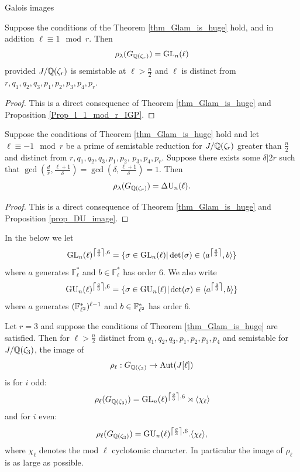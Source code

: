 \documentclass[11pt,a4paper]{article}
\newcommand{\Fl}{\mathbb{F}_\ell}
\newcommand{\Qr}{{\QQ(\zeta_r)}}
\newcommand{\Gcyclo}[1]{G_{\QQ(\zeta_{#1})}}
\newcommand{\GQr}{G_{\QQ(\zeta_{r})}}
\begin{document}
\begin{section}{Galois images}
\begin{theorem}
\label{thm_l_equiv_1_mod_r_image_of_mod_lambda}
Suppose the conditions of the Theorem \ref{thm_Glam_is_huge} hold, and in addition $\ell \equiv 1 \mod{r}$. Then \[\rho_\lambda(\GQr) = \GL_n(\ell)\]
provided $J/\Qr$ is semistable at $\ell>\frac{n}{2}$  and $\ell$ is distinct from $r,q_1,q_2,q_3,p_1,p_2,p_3,p_4,p_r$.
\end{theorem}

\begin{proof}
This is a direct consequence of Theorem \ref{thm_Glam_is_huge} and Proposition \ref{Prop_l_1_mod_r_IGP}.
\end{proof}

\begin{theorem}
\label{thm_DU_image_r=-1}
Suppose the conditions of Theorem \ref{thm_Glam_is_huge} hold and let $\ell \equiv -1 \mod{r}$ be a prime of semistable reduction for $J/\Qr$ greater than $\frac{n}{2}$ and distinct from $ r,q_1,q_2,q_3,p_1,p_2$, $p_3,p_4,p_r$.
Suppose there exists some $\delta|2r$ such that $\gcd(\frac{d}{r},\frac{\ell+1}{\delta})= \gcd(\delta, \frac{\ell+1}{\delta})=1$.
Then \[\rho_\lambda(\GQr) = \DU_n(\ell).\]
\end{theorem}

\begin{proof}
This is a direct consequence of Theorem \ref{thm_Glam_is_huge} and Proposition \ref{prop_DU_image}.
\end{proof}

In the below we let \[\GL_n(\ell)^{\left\lceil \frac{g}{3} \right\rceil, 6} = \{\sigma \in \GL_n(\ell)| \det(\sigma) \in \langle a^{\left\lceil \frac{g}{3} \right\rceil},b\rangle \}\] where $a$ generates $\Fl^*$ and $b \in \Fl^*$ has order $6$. We also write \[\GU_n(\ell)^{\left\lceil \frac{g}{3} \right\rceil, 6} =
\{ \sigma \in \GU_n(\ell)| \det(\sigma) \in \langle a^{\left\lceil \frac{g}{3} \right\rceil},b\rangle \}\] where $a$ generates $(\mathbb{F}_{\ell^2}^*)^{\ell-1}$ and $b \in \mathbb{F}_{\ell^2}^*$ has order $6$.

\begin{theorem}
\label{thm_r=3_exact_image_surjective}
Let $r=3$ and suppose the conditions of Theorem \ref{thm_Glam_is_huge} are satisfied.
Then for $\ell>\frac{n}{2}$ distinct from $q_1,q_2,q_3,p_1,p_2,p_3,p_4$ and semistable for $J/\mathbb{Q}(\zeta_3)$, the image of  \[\rho_\ell:\Gcyclo{3} \rightarrow \Aut(J[\ell])\] is for $i$ odd:
\[\rho_\ell(\Gcyclo{3}) = \GL_n(\ell)^{\left\lceil \frac{g}{3} \right\rceil, 6} \rtimes \langle \chi_\ell\rangle\]
and for $i$ even:
\[\rho_\ell(\Gcyclo{3}) = \GU_n(\ell)^{\left\lceil \frac{g}{3} \right\rceil, 6} . \langle \chi_\ell\rangle,\]
where $\chi_\ell$ denotes the mod $\ell$ cyclotomic character.
In particular the image of $\rho_\ell$ is as large as possible.
\end{theorem}


\end{section}
\end{document}
